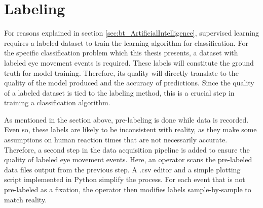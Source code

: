 \section{Labeling} \label{sec:meth_Labeling}

For reasons explained in section \ref{sec:bt_ArtificialIntelligence}, supervised learning requires a labeled dataset to train the learning algorithm for classification. For the specific classification problem which this thesis presents, a dataset with labeled eye movement events is required. These labels will constitute the ground truth for model training. Therefore, its quality will directly translate to the quality of the model produced and the accuracy of predictions. Since the quality of a labeled dataset is tied to the labeling method, this is a crucial step in training a classification algorithm. 

As mentioned in the section above, pre-labeling is done while data is recorded. Even so, these labels are likely to be inconsistent with reality, as they make some assumptions on human reaction times that are not necessarily accurate. Therefore, a second step in the data acquisition pipeline is added to ensure the quality of labeled eye movement events. Here, an operator scans the pre-labeled data files output from the previous step. A .csv editor and a simple plotting script implemented in Python simplify the process. For each event that is not pre-labeled as a fixation, the operator then modifies labels sample-by-sample to match reality.